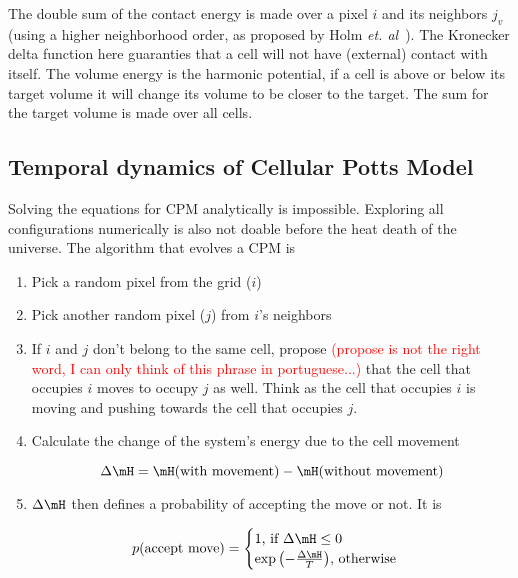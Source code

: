 The double sum of the contact energy is made over a pixel $i$ and its neighbors $j_v$ (using a higher neighborhood order, as proposed by Holm \textit{et. al}~\cite{holm1991effects}). The Kronecker delta function here guaranties that a cell will not have (external) contact with itself. The volume energy is the harmonic potential, if a cell is above or below its target volume it will change its volume to be closer to the target. The sum for the target volume is made over all cells.

\subsection{Temporal dynamics of Cellular Potts Model}\label{sec:abm:apm-history:cpm-dyn}

Solving the equations for CPM analytically is impossible. Exploring all configurations numerically is also not doable before the heat death of the universe. The algorithm that evolves a CPM is

\begin{enumerate}
    \item Pick a random pixel from the grid ($i$)
    \item Pick another random pixel ($j$) from $i$'s neighbors
    \item If $i$ and $j$ don't belong to the same cell, propose \textcolor{red}{(propose is not the right word, I can only think of this phrase in portuguese...)} that the cell that occupies $i$ moves to occupy $j$ as well. Think as the cell that occupies $i$ is moving and pushing towards the cell that occupies $j$. 
    \item Calculate the change of the system's energy due to the cell movement
    
    \begin{equation}\label{eq:abm:flip-attempt:delta}
        \Delta \mH = \mH(\text{with movement}) - \mH(\text{without movement})
    \end{equation}
    
    \item $\Delta \mH$ then defines a probability of accepting the move or not. It is
    
    \begin{equation}\label{eq:abm:flip-attempt:prob}
        p(\text{accept move}) = \begin{cases}
        1\text{, if } \Delta \mH \leq 0\\
        \exp{\left(-\frac{\Delta \mH}{T}\right)}\text{, otherwise}
        \end{cases}
    \end{equation}
\end{enumerate}

